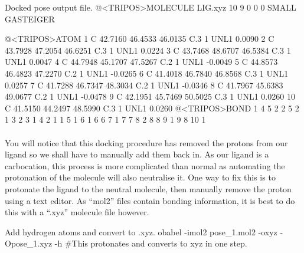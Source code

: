     \begin{bashoutput}[label=out:mol2]{Docked pose output file.}
@<TRIPOS>MOLECULE
LIG.xyz
 10 9 0 0 0
SMALL
GASTEIGER

@<TRIPOS>ATOM
      1 C  42.7160   46.4533   46.0135 C.3     1  UNL1        0.0090
      2 C  43.7928   47.2054   46.6251 C.3     1  UNL1        0.0224
      3 C  43.7468   48.6707   46.5384 C.3     1  UNL1        0.0047
      4 C  44.7948   45.1707   47.5267 C.2     1  UNL1       -0.0049
      5 C  44.8573   46.4823   47.2270 C.2     1  UNL1       -0.0265
      6 C  41.4018   46.7840   46.8568 C.3     1  UNL1        0.0257
      7 C  41.7288   46.7347   48.3034 C.2     1  UNL1       -0.0346
      8 C  41.7967   45.6383   49.0677 C.2     1  UNL1       -0.0478
      9 C  42.1951   45.7469   50.5025 C.3     1  UNL1        0.0260
     10 C  41.5150   44.2497   48.5990 C.3     1  UNL1        0.0260
@<TRIPOS>BOND
     1     4     5    2
     2     5     2    1
     3     2     3    1
     4     2     1    1
     5     1     6    1
     6     6     7    1
     7     7     8    2
     8     8     9    1
     9     8    10    1
    \end{bashoutput}

    \paragraph{}
        You will notice that this docking procedure has removed the protons from our ligand so we shall have to manually add them back in. As our ligand is a carbocation, this process is more complicated than normal as automating the protonation of the molecule will also neutralise it. One way to fix this is to protonate the ligand to the neutral molecule, then manually remove the proton using a text editor. As \enquote{mol2} files contain bonding information, it is best to do this with a \enquote{.xyz} molecule file however.

    \begin{bashcmd}[label=cmd:addH]{Add hydrogen atoms and convert to .xyz.}
        obabel -imol2 pose_1.mol2 -oxyz -Opose_1.xyz -h   
        #This protonates and converts to xyz in one step.
    \end{bashcmd}

